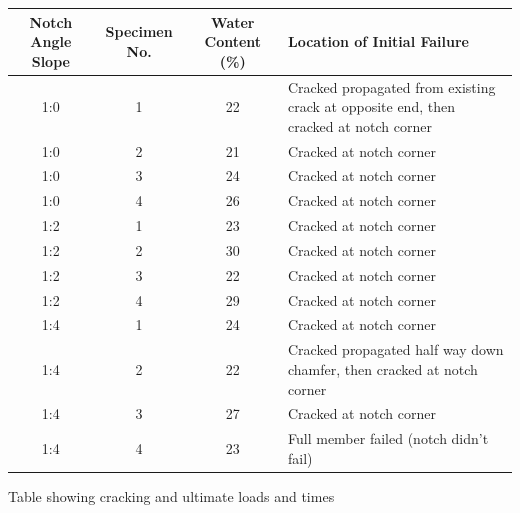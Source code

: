 \documentclass[11pt,a4paper]{article}
\numberwithin{equation}{subsection}
\begin{document}
\pagebreak
{}
\begin{center}
	\begin{tabular}{|c|c|c|p{4.5cm}|} 
		\hline
		
		\textbf{Notch Angle Slope} & \textbf{Specimen No.} & \textbf{Water Content (\%)} & \textbf{Location of Initial Failure}\\ [0.5ex]
		\hline
		
		1:0 & 1 & 22 & Cracked propagated from existing crack at opposite end, then cracked at notch corner  \\ [0.5ex]
		\hline
		1:0 & 2 & 21 & Cracked at notch corner  \\ [0.5ex]
		\hline
		1:0 & 3 & 24 & Cracked at notch corner  \\ [0.5ex]
		\hline
		1:0 & 4 & 26 & Cracked at notch corner \\ [0.5ex]
		\hline
		
		1:2 & 1 & 23 & Cracked at notch corner \\ [0.5ex]
		\hline
		1:2 & 2 & 30 & Cracked at notch corner \\ [0.5ex]
		\hline
		1:2 & 3 & 22 & Cracked at notch corner \\ [0.5ex]
		\hline
		1:2 & 4 & 29 & Cracked at notch corner \\ [0.5ex]
		\hline
		
		1:4 & 1 & 24 & Cracked at notch corner \\ [0.5ex]
		\hline
		1:4 & 2 & 22 & Cracked propagated half way down chamfer, then cracked at notch corner \\ [0.5ex]
		\hline
		1:4 & 3 & 27 & Cracked at notch corner \\ [0.5ex]
		\hline
		1:4 & 4 & 23 & Full member failed (notch didn't fail) \\ [0.5ex]
		\hline
		
	\end{tabular}
\end{center}


\vspace*{\baselineskip}
\noindent Table showing cracking and ultimate loads and times \par
\end{document}
